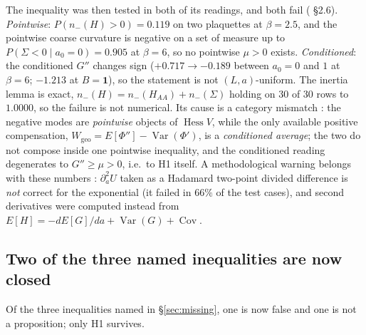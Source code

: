 The inequality was then tested in both of its readings, and both fail (
\S2.6). \emph{Pointwise}: $P(n_-(H)>0)=0.119$ on two plaquettes at $\beta=2.5$, and the pointwise coarse
curvature is negative on a set of measure up to $P(\Sigma<0\mid a_0{=}0)=0.905$ at $\beta=6$, so no
pointwise $\mu>0$ exists. \emph{Conditioned}: the conditioned $G''$ changes sign ($+0.717\to-0.189$
between $a_0=0$ and $1$ at $\beta=6$; $-1.213$ at $B=\mathbf 1$), so the statement is not
$(L,a)$-uniform. The inertia lemma is exact, $n_-(H)=n_-(H_{AA})+n_-(\Sigma)$ holding on 30 of 30 rows to
$1.0000$, so the failure is not numerical. Its cause is a category mismatch \LN: the negative modes are
\emph{pointwise} objects of $\operatorname{Hess}V$, while the only available positive compensation,
$W_{\mathrm{geo}}=E[\Phi'']-\operatorname{Var}(\Phi')$, is a \emph{conditioned average}; the two do not
compose inside one pointwise inequality, and the conditioned reading degenerates to $G''\ge\mu>0$,
i.e.\ to H1 itself. A methodological warning belongs with these numbers \LE: $\partial_a^2U$ taken as a
Hadamard two-point divided difference is \emph{not} correct for the exponential (it failed in $66\%$ of
the test cases), and second derivatives were computed instead from
$E[H]=-dE[G]/da+\operatorname{Var}(G)+\operatorname{Cov}$.

\subsection{Two of the three named inequalities are now closed}

Of the three inequalities named in \S\ref{sec:missing}, one is now false and one is not a proposition;
only H1 survives.

